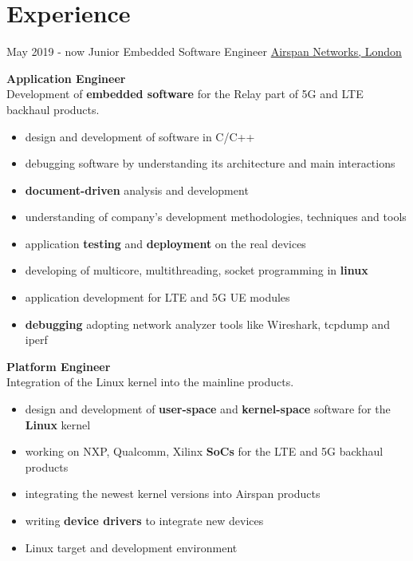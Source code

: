 \documentclass[letterpaper]{twentysecondcv} %
\begin{document}
\makeprofile %


\section{Experience}

\begin{twenty} %
    \twentyitem
    	{May 2019 -}
		{now}
        {Junior Embedded Software Engineer}
        {\href{https://www.airspan.com/}{Airspan Networks, London}}
        {}
        {
            \textbf{Application Engineer}\\
            Development of \textbf{embedded software} for the Relay part of 5G and LTE backhaul products.
            \begin{itemize}
                \item design and development of software in C/C++
                \item debugging software by understanding its architecture and main interactions
                \item \textbf{document-driven} analysis and development
                \item understanding of company's development methodologies, techniques and tools
                \item application \textbf{testing} and \textbf{deployment} on the real devices
                \item developing of multicore, multithreading, socket programming in \textbf{linux}
                \item application development for LTE and 5G UE modules
                \item \textbf{debugging} adopting network analyzer tools like Wireshark, tcpdump and iperf
            \end{itemize}
            
            \textbf{Platform Engineer}\\
            Integration of the Linux kernel into the mainline products.
            \begin{itemize}
                \item design and development of \textbf{user-space} and \textbf{kernel-space} software for the \textbf{Linux} kernel
                \item working on NXP, Qualcomm, Xilinx \textbf{SoCs} for the LTE and 5G backhaul products
                \item integrating the newest kernel versions into Airspan products
                \item writing \textbf{device drivers} to integrate new devices
                \item Linux target and development environment
            \end{itemize}
            
}
\end{twenty}
\end{document}
